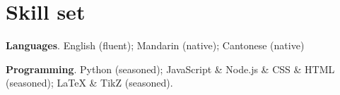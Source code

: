\documentclass[letterpaper,11pt]{article}
\begin{document}
    \section{Skill set}

    \begin{resumeItemize}
        \item \textbf{Languages}. English (fluent); Mandarin (native); Cantonese (native)
        \item \textbf{Programming}. Python (seasoned); JavaScript \& Node.js \& CSS \& HTML (seasoned); LaTeX \& TikZ (seasoned).
    \end{resumeItemize}
\end{document}

